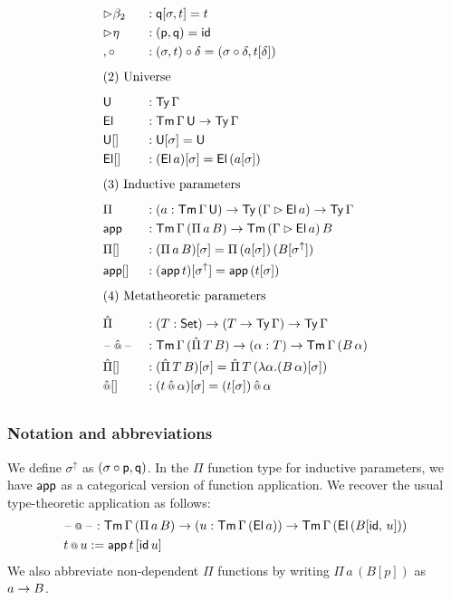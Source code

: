 \documentclass[a4paper,UKenglish,cleveref, autoref]{lipics-v2019}
\begin{document}
\begin{alignat*}{5}
  & {\ext\beta_2} && : \q[\sigma, t] = t \\
  & {\ext\eta} && : (\p, \q) = \id \\
  & {,\circ} && : (\sigma, t)\circ\delta = (\sigma\circ\delta, t[\delta]) \\[0.5em]
  & \rlap{(2) Universe} \\[0.5em]
  & \U && : \Ty\,\Gamma \\
  & \El && : \Tm\,\Gamma\,\U\ra\Ty\,\Gamma \\
  & {\U[]} && : \U[\sigma] = \U \\
  & {\El[]} && : (\El\,a)[\sigma] = \El\,(a[\sigma]) \\[0.5em]
  & \rlap{(3) Inductive parameters} \\[0.5em]
  & \Pi && : (a:\Tm\,\Gamma\,\U)\ra\Ty\,(\Gamma\ext\El\,a)\ra\Ty\,\Gamma \\
  & \app && : \Tm\,\Gamma\,(\Pi\,a\,B)\ra\Tm\,(\Gamma\ext \El\,a)\,B \\
  & {\Pi[]} && : (\Pi\,a\,B)[\sigma] = \Pi\,(a[\sigma])\,(B[\sigma^\uparrow]) \\
  & {\app[]} && : (\app\,t)[\sigma^\uparrow] = \app\,(t[\sigma]) \\[0.5em]
  & \rlap{(4) Metatheoretic parameters} \\[0.5em]
  & \Pim && : (T:\Set)\ra(T\ra\Ty\,\Gamma)\ra\Ty\,\Gamma \\
  & \blank\appm \blank && : \Tm\,\Gamma\,(\Pim\,T\,B)\ra(\alpha:T) \ra\Tm\,\Gamma\,(B\,\alpha) \\
  & {\Pim[]} && : (\Pim\,T\,B)[\sigma] = \Pim\,T\,(\lambda \alpha.(B\,\alpha)[\sigma]) \\
  & {\appm[]} && : (t\appm\alpha)[\sigma] = (t[\sigma])\mathop{\appm}\alpha \\[0.5em]
\end{alignat*}
\subsubsection{Notation and abbreviations}

We define $\sigma^\uparrow$ as $(\sigma\circ\mathsf{p},\mathsf{q})$. In the $\Pi$ function type
for inductive parameters, we have $\mathsf{app}$ as a categorical version of function
application. We recover the usual type-theoretic application as follows:
\begin{alignat*}{5}
  & \mathord{\hspace{1pt}\text{--}\hspace{1pt}}\mathop{{\scriptstyle @}}\mathord{\hspace{1pt}\text{--}\hspace{1pt}} : \mathsf{Tm}\,\Gamma\,(\Pi\,a\,B)\rightarrow (u : \mathsf{Tm}\,\Gamma\,(\mathsf{El}\,a))
  \rightarrow \mathsf{Tm}\,\Gamma\,(\mathsf{El}\,(B[\mathsf{id},\,u])) \\
  & t \mathop{{\scriptstyle @}} u := \mathsf{app}\,t\,[\mathsf{id}\,u]
\end{alignat*}
We also abbreviate non-dependent $\Pi$ functions by writing $\Pi\,a\,(B[p])$ as $a\rightarrow B$.
\end{document}
